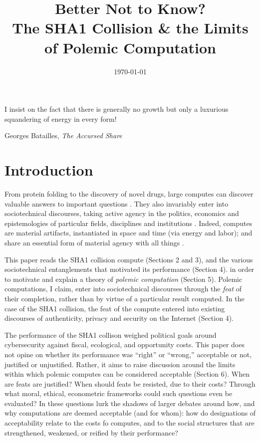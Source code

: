 \documentclass[sigconf]{acmart}
\date{\today}
\title{Better Not to Know?\\\medskip
\large The SHA1 Collision \& the Limits of Polemic Computation}
\begin{document}
\maketitle

\epigraph{I insist on the fact that there is generally no growth but only a luxurious squandering of energy in every form!}{Georges Batailles, \textit{The Accursed Share}}


\section{Introduction}
\label{sec:orgddee10a}

From protein folding to the discovery of novel drugs,
large computes can discover valuable answers to important questions
\cite{Anderson2004}.
They also invariably enter into sociotechnical discourses,
taking active agency in the politics, economics and epistemologies 
of particular fields, disciplines and institutions \cite{Ames2015}.
Indeed, computes are material artifacts, instantiated in space and time (via energy and labor);
and share an essential form of material agency with all things \cite{Bennett2013a,Winner2003}.

This paper reads the SHA1 collision compute (Sections 2 and 3), 
and the various sociotechnical entanglements that motivated its performance (Section 4).
in order to motivate and explain a theory of \emph{polemic computation} (Section 5).
Polemic computations, I claim, enter into sociotechnical discourses through the \emph{feat} of their completion, rather than by virtue of a particular result computed.
In the case of the SHA1 collision, the feat of the compute entered into existing discourses of authenticity, privacy and security on the Internet (Section 4).

The performance of the SHA1 collison weighed political goals around cybersecurity against fiscal, ecological, and opportunity costs.
This paper does not opine on whether its performance was ``right'' or ``wrong,'' acceptable or not, justified or unjustified.
Rather, it aims to raise discussion around the limits within which polemic computes can be considered acceptable (Section 6).
When are feats are justified? 
When should feats be resisted, due to their costs? 
Through what moral, ethical, econometric frameworks could such questions even be evaluated? 
In these questions lurk the shadows of larger debates around how, and why computations are deemed acceptable (and for whom):
how do designations of acceptability relate to the costs fo computes, and to the social structures that are strengthened, weakened, or reified by their performance?
\end{document}
